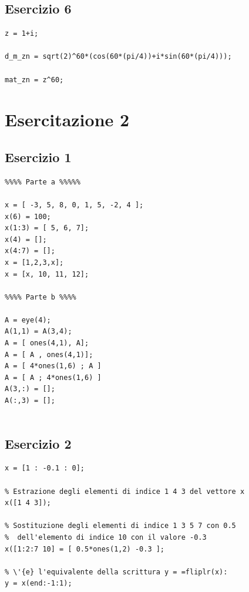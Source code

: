 \documentclass{article}
\newcommand{\vs}{\vspace*{1.0cm}}
\begin{document}
\vs
\subsection{ Esercizio 6}
\begin{lstlisting}
z = 1+i;

d_m_zn = sqrt(2)^60*(cos(60*(pi/4))+i*sin(60*(pi/4)));

mat_zn = z^60;

\end{lstlisting}



\newpage
\section{ Esercitazione 2}


\vs
\subsection{ Esercizio 1}
\begin{lstlisting}
%%%% Parte a %%%%%

x = [ -3, 5, 8, 0, 1, 5, -2, 4 ];
x(6) = 100;
x(1:3) = [ 5, 6, 7];
x(4) = [];
x(4:7) = [];
x = [1,2,3,x];
x = [x, 10, 11, 12];

%%%% Parte b %%%%

A = eye(4);
A(1,1) = A(3,4);
A = [ ones(4,1), A];
A = [ A , ones(4,1)];
A = [ 4*ones(1,6) ; A ]
A = [ A ; 4*ones(1,6) ]
A(3,:) = [];
A(:,3) = [];
 
\end{lstlisting}


\vs
\subsection{ Esercizio 2}
\begin{lstlisting}
x = [1 : -0.1 : 0];

% Estrazione degli elementi di indice 1 4 3 del vettore x
x([1 4 3]);

% Sostituzione degli elementi di indice 1 3 5 7 con 0.5 
%  dell'elemento di indice 10 con il valore -0.3
x([1:2:7 10] = [ 0.5*ones(1,2) -0.3 ];

% \'{e} l'equivalente della scrittura y = =fliplr(x):
y = x(end:-1:1);

\end{lstlisting}
\end{document}
